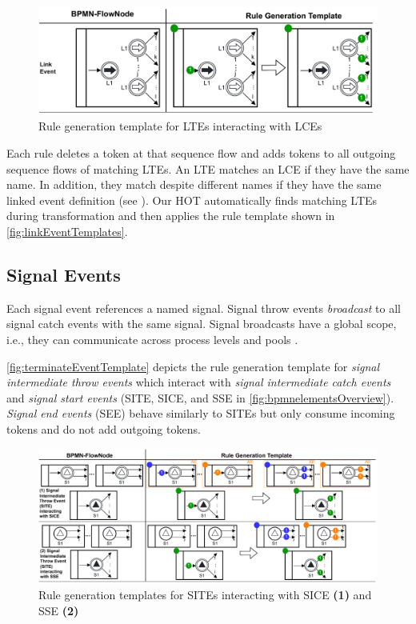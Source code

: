 \documentclass{lmcs} %
\begin{document}
\begin{figure}[ht]
    \centering
    \includegraphics[width=1\textwidth]{images/linkEvent_template.pdf}
    \caption{Rule generation template for LTEs interacting with LCEs}
    \label{fig:linkEventTemplates}
\end{figure}

Each rule deletes a token at that sequence flow and adds tokens to all outgoing sequence flows of matching LTEs.
An LTE matches an LCE if they have the same name.
In addition, they match despite different names if they have the same linked event definition (see \cite{objectmanagementgroupBusinessProcessModel2013}).
Our HOT automatically finds matching LTEs during transformation and then applies the rule template shown in \autoref{fig:linkEventTemplates}.

\subsection{Signal Events}
Each signal event references a named signal.
Signal throw events \textit{broadcast} to all signal catch events with the same signal.
Signal broadcasts have a global scope, i.e., they can communicate across process levels and pools \cite{objectmanagementgroupBusinessProcessModel2013}.

\autoref{fig:terminateEventTemplate} depicts the rule generation template for \textit{signal intermediate throw events} which interact with \textit{signal intermediate catch events} and \textit{signal start events} (\textsf{SITE}, \textsf{SICE}, and \textsf{SSE} in \autoref{fig:bpmnelementsOverview}).
\textit{Signal end events} (\textsf{SEE}) behave similarly to SITEs but only consume incoming tokens and do not add outgoing tokens.

\begin{figure}[ht]
    \centering
    \includegraphics[width=1\textwidth]{images/signal_rule_template.pdf}
    \caption{Rule generation templates for SITEs interacting with SICE \textbf{(1)} and SSE \textbf{(2)}}
    \label{fig:signalEventTemplates}
\end{figure}
\end{document}
